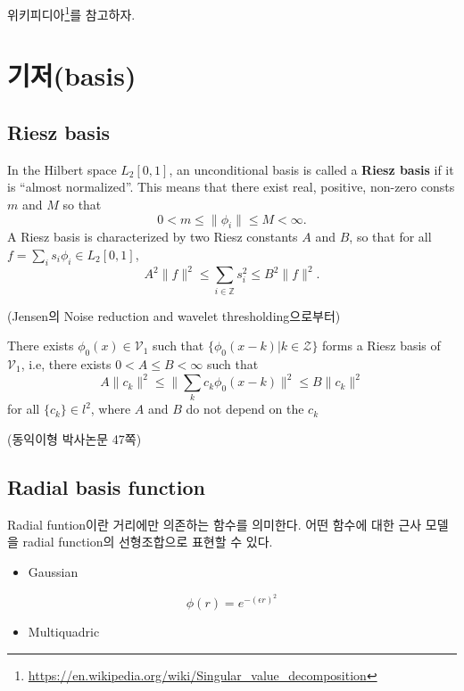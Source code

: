 \documentclass[b5paper,]{scrbook}
\providecommand{\tightlist}{%
  \setlength{\itemsep}{0pt}\setlength{\parskip}{0pt}}
\theoremstyle{plain}
\theoremstyle{definition}
\numberwithin{equation}{section}
\renewcommand{\href}[2]{#2\footnote{\url{#1}}}
\begin{document}
\href{https://en.wikipedia.org/wiki/Singular_value_decomposition}{위키피디아}를
참고하자.

\section{기저(basis)}\label{basis}

\subsection{Riesz basis}\label{riesz-basis}

In the Hilbert space \(L_{2}[0,1]\), an unconditional basis is called a
\textbf{Riesz basis} if it is ``almost normalized''. This means that
there exist real, positive, non-zero consts \(m\) and \(M\) so that
\[0 < m \leq \| \phi_{i}\|\leq M < \infty.\] A Riesz basis is
characterized by two Riesz constants \(A\) and \(B\), so that for all
\(f=\sum_{i}s_{i}\phi_{i}\in L_{2}[0,1]\),
\[A^{2}\| f \|^{2}\leq \sum_{i\in\mathbb{Z}}s_{i}^{2}\leq B^{2}\|f\|^{2}.\]

(Jensen의 Noise reduction and wavelet thresholding으로부터)

There exists \(\phi_{0}(x)\in\mathcal{V}_{1}\) such that
\(\{ \phi_{0}(x-k) | k\in\mathcal{Z} \}\) forms a Riesz basis of
\(\mathcal{V}_{1}\), i.e, there exists \(0< A \leq B <\infty\) such that
\[A \| c_{k}\|^{2} \leq \| \sum_{k}c_{k}\phi_{0}(x-k)\|^{2} \leq B \| c_{k} \|^{2}\]
for all \(\{c_{k}\}\in l^{2}\), where \(A\) and \(B\) do not depend on
the \(c_{k}\)

(동익이형 박사논문 47쪽)

\subsection{Radial basis function}\label{radial-basis-function}

Radial funtion이란 거리에만 의존하는 함수를 의미한다. 어떤 함수에 대한
근사 모델을 radial function의 선형조합으로 표현할 수 있다.

\begin{itemize}
\tightlist
\item
  Gaussian
\end{itemize}

\[\phi(r)=e^{-(\epsilon r)^{2}}\]

\begin{itemize}
\tightlist
\item
  Multiquadric
\end{itemize}
\end{document}
